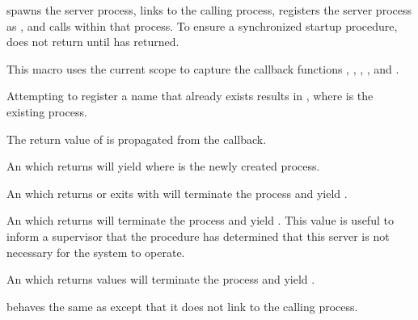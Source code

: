  spawns the server process, links to
the calling process, registers the server process as , and calls
 within that process. To ensure a
synchronized startup procedure,  does
not return until  has returned.

This macro uses the current scope to capture the callback functions
, , ,
, and .

Attempting to register a name that already exists results in
, where
 is the existing process.

The return value of  is propagated from
the  callback.

An  which returns  will yield  where
 is the newly created process.

An  which returns  or exits
with  will terminate the process and yield
.

An  which returns  will terminate the
process and yield . This value is useful to inform a
supervisor that the  procedure has determined that this
server is not necessary for the system to operate.

An  which returns  values will terminate the
process and yield .

\begin{syntax}
\end{syntax}
\returns{}

 behaves the same as 
except that it does not link to the calling process.

\begin{procedure}
\end{procedure}
\returns{}

\begin{argtbl}
\end{argtbl}

